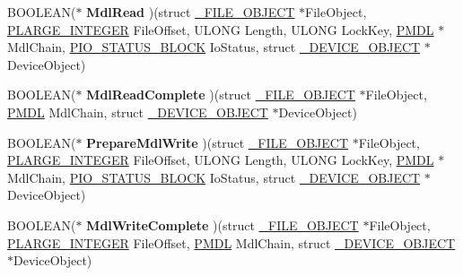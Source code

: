 \begin{DoxyCompactItemize}
\item 
\hypertarget{struct__FAST__IO__DISPATCH_a4c1b911ced489fab4d8c0f8453ac83eb}{}B\+O\+O\+L\+E\+A\+N($\ast$ {\bfseries Mdl\+Read} )(struct \hyperlink{struct__FILE__OBJECT}{\+\_\+\+F\+I\+L\+E\+\_\+\+O\+B\+J\+E\+C\+T} $\ast$File\+Object, \hyperlink{union__LARGE__INTEGER}{P\+L\+A\+R\+G\+E\+\_\+\+I\+N\+T\+E\+G\+E\+R} File\+Offset, U\+L\+O\+N\+G Length, U\+L\+O\+N\+G Lock\+Key, \hyperlink{struct__MDL}{P\+M\+D\+L} $\ast$Mdl\+Chain, \hyperlink{struct__IO__STATUS__BLOCK}{P\+I\+O\+\_\+\+S\+T\+A\+T\+U\+S\+\_\+\+B\+L\+O\+C\+K} Io\+Status, struct \hyperlink{struct__DEVICE__OBJECT}{\+\_\+\+D\+E\+V\+I\+C\+E\+\_\+\+O\+B\+J\+E\+C\+T} $\ast$Device\+Object)\label{struct__FAST__IO__DISPATCH_a4c1b911ced489fab4d8c0f8453ac83eb}

\item 
\hypertarget{struct__FAST__IO__DISPATCH_a5119ea044cfac302d85b6cfc55704ffc}{}B\+O\+O\+L\+E\+A\+N($\ast$ {\bfseries Mdl\+Read\+Complete} )(struct \hyperlink{struct__FILE__OBJECT}{\+\_\+\+F\+I\+L\+E\+\_\+\+O\+B\+J\+E\+C\+T} $\ast$File\+Object, \hyperlink{struct__MDL}{P\+M\+D\+L} Mdl\+Chain, struct \hyperlink{struct__DEVICE__OBJECT}{\+\_\+\+D\+E\+V\+I\+C\+E\+\_\+\+O\+B\+J\+E\+C\+T} $\ast$Device\+Object)\label{struct__FAST__IO__DISPATCH_a5119ea044cfac302d85b6cfc55704ffc}

\item 
\hypertarget{struct__FAST__IO__DISPATCH_a2fe2eaa2c17052450c41dc61d09a5a6f}{}B\+O\+O\+L\+E\+A\+N($\ast$ {\bfseries Prepare\+Mdl\+Write} )(struct \hyperlink{struct__FILE__OBJECT}{\+\_\+\+F\+I\+L\+E\+\_\+\+O\+B\+J\+E\+C\+T} $\ast$File\+Object, \hyperlink{union__LARGE__INTEGER}{P\+L\+A\+R\+G\+E\+\_\+\+I\+N\+T\+E\+G\+E\+R} File\+Offset, U\+L\+O\+N\+G Length, U\+L\+O\+N\+G Lock\+Key, \hyperlink{struct__MDL}{P\+M\+D\+L} $\ast$Mdl\+Chain, \hyperlink{struct__IO__STATUS__BLOCK}{P\+I\+O\+\_\+\+S\+T\+A\+T\+U\+S\+\_\+\+B\+L\+O\+C\+K} Io\+Status, struct \hyperlink{struct__DEVICE__OBJECT}{\+\_\+\+D\+E\+V\+I\+C\+E\+\_\+\+O\+B\+J\+E\+C\+T} $\ast$Device\+Object)\label{struct__FAST__IO__DISPATCH_a2fe2eaa2c17052450c41dc61d09a5a6f}

\item 
\hypertarget{struct__FAST__IO__DISPATCH_afd1f087e148ea83ef0b45e7d9c86ffb0}{}B\+O\+O\+L\+E\+A\+N($\ast$ {\bfseries Mdl\+Write\+Complete} )(struct \hyperlink{struct__FILE__OBJECT}{\+\_\+\+F\+I\+L\+E\+\_\+\+O\+B\+J\+E\+C\+T} $\ast$File\+Object, \hyperlink{union__LARGE__INTEGER}{P\+L\+A\+R\+G\+E\+\_\+\+I\+N\+T\+E\+G\+E\+R} File\+Offset, \hyperlink{struct__MDL}{P\+M\+D\+L} Mdl\+Chain, struct \hyperlink{struct__DEVICE__OBJECT}{\+\_\+\+D\+E\+V\+I\+C\+E\+\_\+\+O\+B\+J\+E\+C\+T} $\ast$Device\+Object)\label{struct__FAST__IO__DISPATCH_afd1f087e148ea83ef0b45e7d9c86ffb0}


\end{DoxyCompactItemize}

